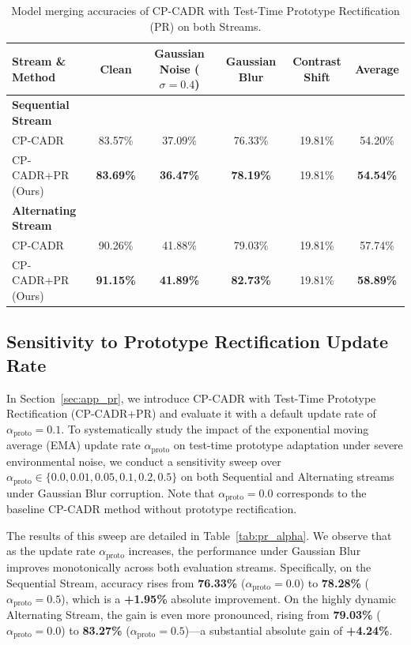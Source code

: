 \documentclass{article}
\theoremstyle{plain}
\theoremstyle{definition}
\theoremstyle{remark}
\begin{document}
\begin{table}[t]
\caption{Model merging accuracies of CP-CADR with Test-Time Prototype Rectification (PR) on both Streams.}
\label{tab:pr_results}
\begin{center}
\begin{small}
\begin{tabular}{lccccc}
\toprule
Stream \& Method & Clean & Gaussian Noise ($\sigma = 0.4$) & Gaussian Blur & Contrast Shift & Average \\
\midrule
\textbf{Sequential Stream} & & & & & \\
CP-CADR & 83.57\% & 37.09\% & 76.33\% & 19.81\% & 54.20\% \\
CP-CADR+PR (Ours) & \textbf{83.69\%} & \textbf{36.47\%} & \textbf{78.19\%} & 19.81\% & \textbf{54.54\%} \\
\midrule
\textbf{Alternating Stream} & & & & & \\
CP-CADR & 90.26\% & 41.88\% & 79.03\% & 19.81\% & 57.74\% \\
CP-CADR+PR (Ours) & \textbf{91.15\%} & \textbf{41.89\%} & \textbf{82.73\%} & 19.81\% & \textbf{58.89\%} \\
\bottomrule
\end{tabular}
\end{small}
\end{center}
\end{table}

\subsection{Sensitivity to Prototype Rectification Update Rate}
\label{sec:app_pr_alpha}
In Section~\ref{sec:app_pr}, we introduce CP-CADR with Test-Time Prototype Rectification (CP-CADR+PR) and evaluate it with a default update rate of $\alpha_{\text{proto}} = 0.1$. To systematically study the impact of the exponential moving average (EMA) update rate $\alpha_{\text{proto}}$ on test-time prototype adaptation under severe environmental noise, we conduct a sensitivity sweep over $\alpha_{\text{proto}} \in \{0.0, 0.01, 0.05, 0.1, 0.2, 0.5\}$ on both Sequential and Alternating streams under Gaussian Blur corruption. Note that $\alpha_{\text{proto}} = 0.0$ corresponds to the baseline CP-CADR method without prototype rectification.

The results of this sweep are detailed in Table~\ref{tab:pr_alpha}. We observe that as the update rate $\alpha_{\text{proto}}$ increases, the performance under Gaussian Blur improves monotonically across both evaluation streams. Specifically, on the Sequential Stream, accuracy rises from \textbf{76.33\%} ($\alpha_{\text{proto}} = 0.0$) to \textbf{78.28\%} ($\alpha_{\text{proto}} = 0.5$), which is a \textbf{+1.95\%} absolute improvement. On the highly dynamic Alternating Stream, the gain is even more pronounced, rising from \textbf{79.03\%} ($\alpha_{\text{proto}} = 0.0$) to \textbf{83.27\%} ($\alpha_{\text{proto}} = 0.5$)---a substantial absolute gain of \textbf{+4.24\%}. 
\end{document}
